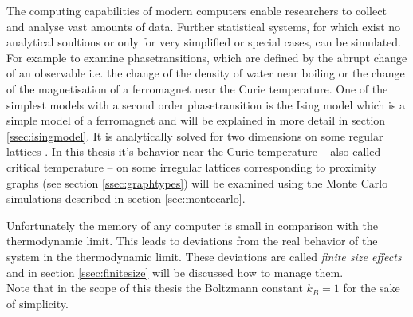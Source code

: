The computing capabilities of modern computers enable researchers to
collect and analyse vast amounts of data.
Further statistical systems, for which exist no analytical soultions
or only for very simplified or special cases, can be simulated.
For example to examine phasetransitions, which are defined by the abrupt
change of an observable i.e. the change of the density of water near
boiling or the change of the magnetisation of a ferromagnet near the
Curie temperature. One of the simplest models with a second order
phasetransition is the Ising model \cite{Ising1925} which is a simple
model of a ferromagnet and will be explained in more detail in section
\ref{ssec:isingmodel}. It is analytically solved for two dimensions on
some regular lattices \cite{Onsager1944} \cite{Wannier1945}.
In this thesis it's behavior near the Curie temperature -- also called
critical temperature -- on some irregular lattices corresponding to
proximity graphs (see section \ref{ssec:graphtypes}) will be examined
using the Monte Carlo simulations described in section \ref{sec:montecarlo}.

Unfortunately the memory of any computer is small in comparison with the
thermodynamic limit. This leads to deviations from the real behavior of
the system in the thermodynamic limit. These deviations are called
\emph{finite size effects} and in section \ref{ssec:finitesize} will be
discussed how to manage them.\\

Note that in the scope of this thesis the Boltzmann constant \(k_{B}=1\)
for the sake of simplicity.
